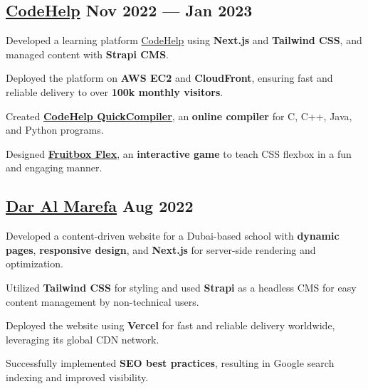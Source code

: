 \subsection{{\href{https://www.thecodehelp.in}{CodeHelp} \hfill Nov 2022 --- Jan 2023}}
\begin{zitemize}
\item Developed a learning platform \href{https://www.thecodehelp.in}{CodeHelp} using \textbf{Next.js} and \textbf{Tailwind CSS}, and managed content with \textbf{Strapi CMS}.
\item Deployed the platform on \textbf{AWS EC2} and \textbf{CloudFront}, ensuring fast and reliable delivery to over \textbf{100k monthly visitors}.
\item Created \href{https://labs.thecodehelp.in/quick-compiler}{\textbf{CodeHelp QuickCompiler}}, an \textbf{online compiler} for C, C++, Java, and Python programs.
\item Designed \href{https://labs.thecodehelp.in/fruitbox-flex}{\textbf{Fruitbox Flex}}, an \textbf{interactive game} to teach CSS flexbox in a fun and engaging manner.
\end{zitemize}

\subsection{{\href{https://www.daralmarefa.ae}{Dar Al Marefa} \hfill Aug 2022}}
\begin{zitemize}
\item Developed a content-driven website for a Dubai-based school with \textbf{dynamic pages}, \textbf{responsive design}, and \textbf{Next.js} for server-side rendering and optimization.
\item Utilized \textbf{Tailwind CSS} for styling and used \textbf{Strapi} as a headless CMS for easy content management by non-technical users.
\item Deployed the website using \textbf{Vercel} for fast and reliable delivery worldwide, leveraging its global CDN network.
\item Successfully implemented \textbf{SEO best practices}, resulting in Google search indexing and improved visibility.
\end{zitemize}


